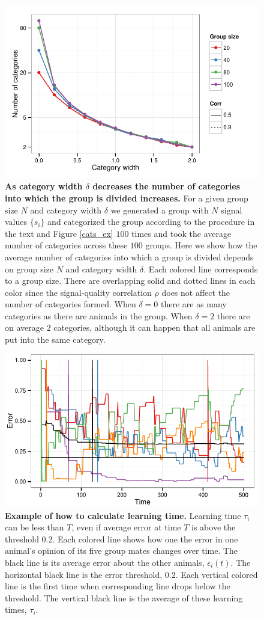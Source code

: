 \begin{figure}[h]
\includegraphics[width=.8\textwidth]{figures/number_of_categories.pdf}
\caption{\sffamily\small\textbf{As category width $\delta$ decreases the number of categories into which the group is divided increases.}
For a given group size $N$ and category width $\delta$ we generated a group with $N$ signal values $\{s_i\}$ and categorized the group according to the procedure in the text and Figure \ref{cats_ex} $100$ times and took the average number of categories across these $100$ groups. Here we show how the average number of categories into which a group is divided depends on group size $N$ and category width $\delta$.  Each colored line corresponds to a group size. There are overlapping solid and dotted lines in each color since the signal-quality correlation $\rho$ does not affect the number of categories formed. When $\delta=0$ there are as many categories as there are animals in the group. When $\delta=2$ there are on average $2$ categories, although it can happen that all animals are put into the same category. }
\label{num_cat}
\end{figure}

\begin{figure}[h]
\includegraphics[width=.8\textwidth]{figures/learning_time_example.pdf}
\caption{\label{learnT.ex} \sffamily\small\textbf{Example of how to calculate learning time.} Learning time $\tau_i$ can be less than $T$, even if average error at time $T$ is above the threshold $0.2$. Each colored line shows how one the error in one animal's opinion of its five group mates changes over time. The black line is its average error about the other animals, $\epsilon_i(t)$. The horizontal black line is the error threshold, $0.2$. Each vertical colored line is the first time when corresponding line drops below the threshold. The vertical black line is the average of these learning times, $\tau_i$.}
\end{figure}

